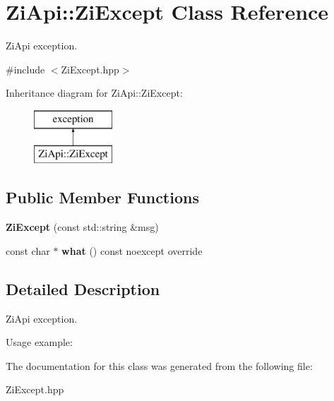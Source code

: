 \hypertarget{classZiApi_1_1ZiExcept}{}\section{Zi\+Api\+::Zi\+Except Class Reference}
\label{classZiApi_1_1ZiExcept}


Zi\+Api exception.  




{\ttfamily \#include $<$Zi\+Except.\+hpp$>$}

Inheritance diagram for Zi\+Api\+::Zi\+Except\+:\begin{figure}[H]
\begin{center}
\leavevmode
\includegraphics[height=2.000000cm]{classZiApi_1_1ZiExcept}
\end{center}
\end{figure}
\subsection*{Public Member Functions}
\begin{DoxyCompactItemize}
\item 
\mbox{\label{classZiApi_1_1ZiExcept_ade964d4f6839a6ee9520d31db9fecc42}} 
{\bfseries Zi\+Except} (const std\+::string \&msg)
\item 
\mbox{\label{classZiApi_1_1ZiExcept_aa0cec723bcc93a164c830d7c6a5e7639}} 
const char $\ast$ {\bfseries what} () const noexcept override
\end{DoxyCompactItemize}


\subsection{Detailed Description}
Zi\+Api exception. 

Usage example\+: 
\begin{DoxyCode}{0}
\DoxyCodeLine{                                                 \textcolor{comment}{//terminate called after throwing an instance of 'ZiApi::ZiExcept'}}
\DoxyCodeLine{                                                 \textcolor{comment}{//what():  Error Message}}
\end{DoxyCode}
 

The documentation for this class was generated from the following file\+:\begin{DoxyCompactItemize}
\item 
Zi\+Except.\+hpp\end{DoxyCompactItemize}
